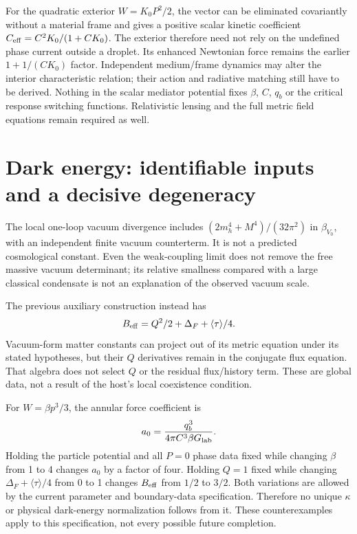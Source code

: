 \documentclass[11pt]{article}
\begin{document}
For the quadratic exterior $W=K_0P^2/2$, the vector can be eliminated
covariantly without a material frame and gives a positive scalar kinetic
coefficient $C_{\rm eff}=C^2K_0/(1+CK_0)$. The exterior therefore need
not rely on the undefined phase current outside a droplet. Its enhanced
Newtonian force remains the earlier $1+1/(CK_0)$ factor.
Independent medium/frame dynamics may alter the interior characteristic
relation; their action and radiative matching still have to be derived.
Nothing in the scalar mediator potential fixes $\beta$, $C$, $q_b$ or the
critical response switching functions. Relativistic lensing and the full
metric field equations remain required as well.

\section{Dark energy: identifiable inputs and a decisive degeneracy}
The local one-loop vacuum divergence includes
$(2m_h^4+M^4)/(32\pi^2)$ in $\beta_{V_0}$, with an independent finite
vacuum counterterm. It is not a predicted cosmological constant. Even the
weak-coupling limit does not remove the free massive vacuum determinant;
its relative smallness compared with a large classical condensate is not
an explanation of the observed vacuum scale.

The previous auxiliary construction instead has
\begin{equation}
 B_{\rm eff}=Q^2/2+\Delta_F+\langle\tau\rangle/4.
\end{equation}
Vacuum-form matter constants can project out of its metric equation under
its stated hypotheses, but their $Q$ derivatives remain in the conjugate
flux equation. That algebra does not select $Q$ or the residual
flux/history term. These are global data, not a result of the host's
local coexistence condition.

For $W=\beta p^3/3$, the annular force coefficient is
\begin{equation}
 a_0=\frac{q_b^3}{4\pi C^3\beta G_{\rm lab}}.
\end{equation}
Holding the particle potential and all $P=0$ phase data fixed while
changing $\beta$ from 1 to 4 changes $a_0$ by a factor of four.
Holding $Q=1$ fixed while changing
$\Delta_F+\langle\tau\rangle/4$ from 0 to 1 changes $B_{\rm eff}$
from $1/2$ to $3/2$. Both variations are allowed by the current parameter
and boundary-data specification. Therefore no unique $\kappa$ or physical
dark-energy normalization follows from it. These counterexamples apply
to this specification, not every possible future completion.
\end{document}
